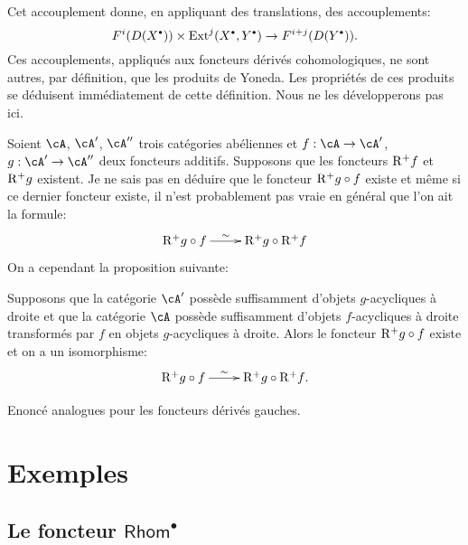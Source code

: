 Cet accouplement donne, en appliquant des translations, des accouplements: 
\[
  F^i(D(X^\bullet))\times \ext^j(X^\bullet,Y^\bullet) \to F^{i+j}(D(Y^\bullet)) \text{.}
\]
Ces accouplements, appliqués aux foncteurs dérivés cohomologiques, ne 
sont autres, par définition, que les produits de Yoneda. Les propriétés 
de ces produits se déduisent immédiatement de cette définition. Nous ne 
les développerons pas ici. 

Soient $\cA$, $\cA'$, $\cA''$ trois catégories abéliennes et 
$f:\cA\to \cA'$, $g:\cA'\to \cA''$ deux foncteurs additifs. Supposons que les 
foncteurs $\mathrm{R}^+ f$ et $\mathrm{R}^+ g$ existent. Je ne sais pas en déduire que le 
foncteur $\mathrm{R}^+ g\circ f$ existe et même si ce dernier foncteur existe, il 
n'est probablement pas vraie en général que l'on ait la formule: 
\[\xymatrix{
  \eR^+ g\circ f\ar[r]^-\sim 
    & \eR^+ g \circ \eR^+ f 
}\]
On a cependant la proposition suivante: 





\begin{proposition}\label{VIII:4-3-1}
Supposons que la catégorie $\cA'$ possède suffisamment d'objets 
$g$-acycliques à droite et que la catégorie $\cA$ possède suffisamment 
d'objets $f$-acycliques à droite transformés par $f$ en objets 
$g$-acycliques à droite. Alors le foncteur $\mathrm{R}^+ g\circ f$ existe et on a un 
isomorphisme: 
\[\xymatrix{
  \eR^+ g\circ f \ar[r]^-\sim 
    & \eR^+ g \circ \eR^+ f \text{.}
}\]
\end{proposition}

Enoncé analogues pour les foncteurs dérivés gauches. 















\section{Exemples}\label{VIII:6} %










\subsection{Le foncteur \texorpdfstring{$\mathsf{Rhom}^\bullet$}{Hom*}}\label{VIII:6-1}

